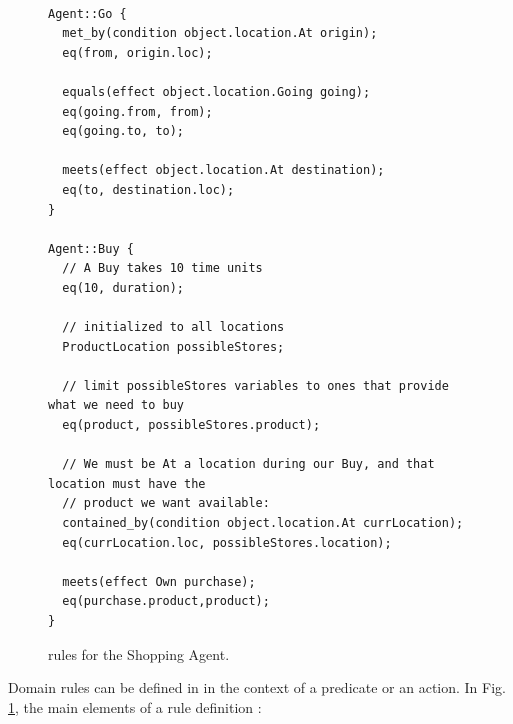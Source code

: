 \begin{figure}[h!]
\begin{verbatim}

Agent::Go {
  met_by(condition object.location.At origin);
  eq(from, origin.loc);
 
  equals(effect object.location.Going going);
  eq(going.from, from);
  eq(going.to, to);
   
  meets(effect object.location.At destination);
  eq(to, destination.loc);
}

Agent::Buy {
  // A Buy takes 10 time units
  eq(10, duration);

  // initialized to all locations
  ProductLocation possibleStores;

  // limit possibleStores variables to ones that provide what we need to buy
  eq(product, possibleStores.product);

  // We must be At a location during our Buy, and that location must have the
  // product we want available:
  contained_by(condition object.location.At currLocation);
  eq(currLocation.loc, possibleStores.location);
  
  meets(effect Own purchase);
  eq(purchase.product,product);
}
\end{verbatim}
\caption{\small \nd rules for the Shopping Agent.}
\label{fig:nddlshop-rules}
\end{figure}

Domain rules can be defined in \nd in the context of a predicate or an
action. In Fig. \ref{fig:nddlshop-rules}, the main elements of a rule
definition :

